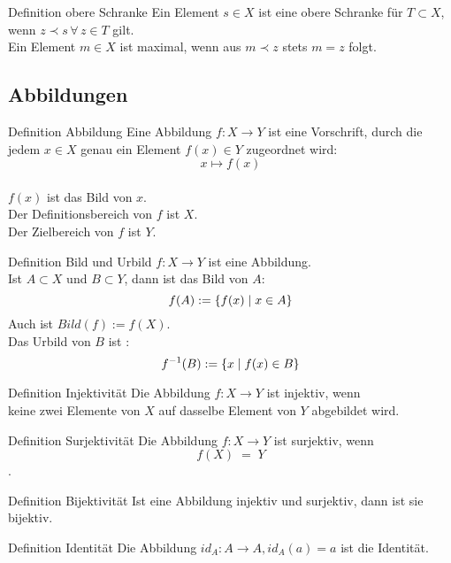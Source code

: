 \documentclass[a6paper,11pt,print,grid=front]{kartei/kartei}
\begin{document}
\begin{karte}{Definition obere Schranke}
    Ein Element \( s \in X \) ist eine obere Schranke für 
    \( T \subset X \), wenn \( z \prec s \,\forall \, z \in T \) 
    gilt.\\
    Ein Element \( m \in X \) ist maximal, wenn aus 
    \( m \prec z \) stets \( m = z \) folgt.
\end{karte}
\subsection*{Abbildungen}
\begin{karte}{Definition Abbildung}
    Eine Abbildung \(f : X \rightarrow Y\) ist eine Vorschrift, 
    durch die jedem \(x \in X \) genau ein Element \(f(x) \in Y\)
    zugeordnet wird:  \\
    \[ x \mapsto f(x)\] \\
     \( f(x)\) ist das Bild von \(x\). \\
    Der Definitionsbereich von \(f\) ist \(X\). \\
    Der Zielbereich von \(f\) ist \(Y\). 
\end{karte}
\begin{karte}{Definition Bild und Urbild}
    \(f : X \rightarrow Y\) ist eine Abbildung. \\
    Ist \(A \subset X\) und \(B \subset Y\),
     dann ist das Bild von \(A\):
    \[f(A) := \{ f(x) \;\vert \; x \in A \}\]
    Auch ist \(Bild(f) := f(X)\). \\
    Das Urbild von \(B\) ist : 
    \[f^{-1}(B) := \{x \;\vert \; f(x) \in B\}\]
\end{karte}
\begin{karte}{Definition Injektivität}
Die Abbildung \(f: X \rightarrow Y\) ist injektiv, wenn \\
keine zwei Elemente von \(X\) auf dasselbe Element von \(Y\) abgebildet wird. 
\end{karte}
\begin{karte}{Definition Surjektivität}
    Die Abbildung \(f: X \rightarrow Y\) ist surjektiv, wenn \\
    \[ f(X) \; = \; Y\].
\end{karte} 
\begin{karte}{Definition Bijektivität}
    Ist eine Abbildung injektiv und surjektiv, dann ist sie bijektiv. 
\end{karte}
\begin{karte}{Definition Identität}
    Die Abbildung \(id_A : A \rightarrow A, id_A(a) = a\) ist die Identität.
\end{karte}
\end{document}
